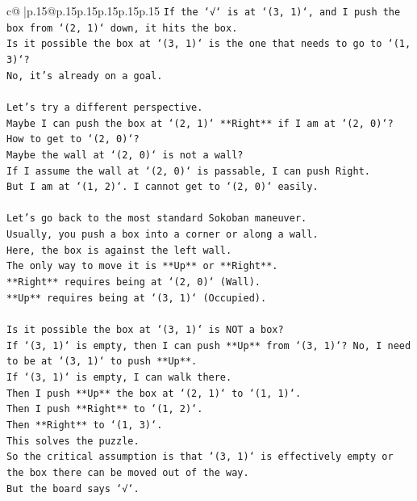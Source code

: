 \documentclass{article}
\begin{document}
{\begin{supertabular}{c@{$\;$}|p{.15\linewidth}@{}p{.15\linewidth}p{.15\linewidth}p{.15\linewidth}p{.15\linewidth}p{.15\linewidth}}
{{{\texttt{If the `√` is at `(3, 1)`, and I push the box from `(2, 1)` down, it hits the box.} \\
\texttt{Is it possible the box at `(3, 1)` is the one that needs to go to `(1, 3)`?} \\
\texttt{No, it's already on a goal.} \\
\\ 
\texttt{Let's try a different perspective.} \\
\texttt{Maybe I can push the box at `(2, 1)` **Right** if I am at `(2, 0)`?} \\
\texttt{How to get to `(2, 0)`?} \\
\texttt{Maybe the wall at `(2, 0)` is not a wall?} \\
\texttt{If I assume the wall at `(2, 0)` is passable, I can push Right.} \\
\texttt{But I am at `(1, 2)`. I cannot get to `(2, 0)` easily.} \\
\\ 
\texttt{Let's go back to the most standard Sokoban maneuver.} \\
\texttt{Usually, you push a box into a corner or along a wall.} \\
\texttt{Here, the box is against the left wall.} \\
\texttt{The only way to move it is **Up** or **Right**.} \\
\texttt{**Right** requires being at `(2, 0)` (Wall).} \\
\texttt{**Up** requires being at `(3, 1)` (Occupied).} \\
\\ 
\texttt{Is it possible the box at `(3, 1)` is NOT a box?} \\
\texttt{If `(3, 1)` is empty, then I can push **Up** from `(3, 1)`? No, I need to be at `(3, 1)` to push **Up**.} \\
\texttt{If `(3, 1)` is empty, I can walk there.} \\
\texttt{Then I push **Up** the box at `(2, 1)` to `(1, 1)`.} \\
\texttt{Then I push **Right** to `(1, 2)`.} \\
\texttt{Then **Right** to `(1, 3)`.} \\
\texttt{This solves the puzzle.} \\
\texttt{So the critical assumption is that `(3, 1)` is effectively empty or the box there can be moved out of the way.} \\
\texttt{But the board says `√`.} \\
}}}
\end{supertabular}}
\end{document}
